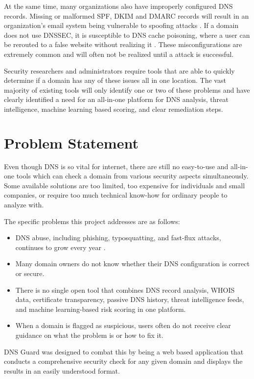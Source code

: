 \documentclass[12pt, a4paper, oneside]{report}
\begin{document}
At the same time, many organizations also have improperly configured DNS records. Missing or malformed SPF, DKIM and DMARC records will result in an organization's email system being vulnerable to spoofing attacks \cite{kitterman2011spf}. If a domain does not use DNSSEC, it is susceptible to DNS cache poisoning, where a user can be rerouted to a false website without realizing it \cite{arends2005rfc4033}. These misconfigurations are extremely common and will often not be realized until a attack is successful.

Security researchers and administrators require tools that are able to quickly determine if a domain has any of these issues all in one location. The vast majority of existing tools will only identify one or two of these problems and have clearly identified a need for an all-in-one platform for DNS analysis, threat intelligence, machine learning based scoring, and clear remediation steps.

\section{Problem Statement}

Even though DNS is so vital for internet, there are still no easy-to-use and all-in-one tools which can check a domain from various security aspects simultaneously. Some available solutions are too limited, too expensive for individuals and small companies, or require too much technical know-how for ordinary people to analyze with.

The specific problems this project addresses are as follows:

\begin{itemize}
    \item DNS abuse, including phishing, typosquatting, and fast-flux attacks, continues to grow every year \cite{apwg2023report}.
    \item Many domain owners do not know whether their DNS configuration is correct or secure.
    \item There is no single open tool that combines DNS record analysis, WHOIS data, certificate transparency, passive DNS history, threat intelligence feeds, and machine learning-based risk scoring in one platform.
    \item When a domain is flagged as suspicious, users often do not receive clear guidance on what the problem is or how to fix it.
\end{itemize}

DNS Guard was designed to combat this by being a web based application that conducts a comprehensive security check for any given domain and displays the results in an easily understood format.
\end{document}
